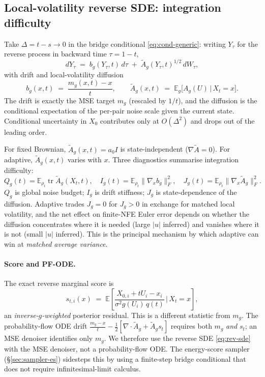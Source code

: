 \documentclass[11pt]{article}
\newcommand{\E}{\mathbb{E}}
\newcommand{\tr}{\operatorname{tr}}
\begin{document}
\subsection{Local-volatility reverse SDE: integration difficulty}
\label{sec:local-vol}

Take $\Delta = t-s\to 0$ in the bridge conditional
\eqref{eq:cond-generic}: writing $Y_\tau$ for the reverse process in
backward time $\tau = 1-t$,
\begin{equation}
    dY_\tau \;=\; b_g(Y_\tau, t)\,d\tau \;+\; \widetilde A_g(Y_\tau, t)^{1/2}\,dW_\tau,
    \label{eq:rev-sde}
\end{equation}
with drift and local-volatility diffusion
\begin{equation}
    \boxed{
    b_g(x, t) \;=\; \frac{m_g(x,t) - x}{t},
    \qquad
    \widetilde A_g(x, t) \;=\; \E_g\!\big[A_g(U)\,\big|\,X_t=x\big].
    }
    \label{eq:b-A}
\end{equation}
The drift is exactly the MSE target $m_g$ (rescaled by $1/t$), and the
diffusion is the conditional expectation of the per-pair noise scale
given the current state. Conditional uncertainty in $X_0$ contributes
only at $O(\Delta^2)$ and drops out of the leading order.

For fixed Brownian, $\widetilde A_g(x,t) = a_0 I$ is state-independent
($\nabla\widetilde A = 0$). For adaptive, $\widetilde A_g(x,t)$ varies
with $x$. Three diagnostics summarise integration difficulty:
\[
    Q_g(t) = \E_{\rho_t}\tr\widetilde A_g(X_t,t),
    \quad
    I_g(t) = \E_{\rho_t}\|\nabla_x b_g\|_F^2,
    \quad
    J_g(t) = \E_{\rho_t}\|\nabla_x \widetilde A_g\|_F^2.
\]
$Q_g$ is global noise budget; $I_g$ is drift stiffness; $J_g$ is
state-dependence of the diffusion. Adaptive trades $J_g=0$ for $J_g>0$
in exchange for matched local volatility, and the net effect on
finite-NFE Euler error depends on whether the diffusion concentrates
where it is needed (large $|u|$ inferred) and vanishes where it is not
(small $|u|$ inferred). This is the principal mechanism by which
adaptive can win at \emph{matched average variance}.

\paragraph{Score and PF-ODE.} The exact reverse marginal score is
\[
    s_{t,i}(x) \;=\; \E\!\left[\frac{X_{0,i}+t U_i - x_i}{\sigma^2 g(U_i)\,q(t)}\,\bigg|\, X_t=x\right],
\]
an \emph{inverse-$g$-weighted} posterior residual. This is a different
statistic from $m_g$. The probability-flow ODE drift
$\tfrac{m_g-x}{t} - \tfrac12[\nabla\!\cdot\!\widetilde A_g + \widetilde A_g s_t]$
requires both $m_g$ \emph{and} $s_t$; an MSE denoiser identifies only
$m_g$. We therefore use the reverse SDE \eqref{eq:rev-sde} with the MSE
denoiser, not a probability-flow ODE. The energy-score sampler
(\S\ref{sec:sampler-es}) sidesteps this by using a finite-step bridge
conditional that does not require infinitesimal-limit calculus.
\end{document}
